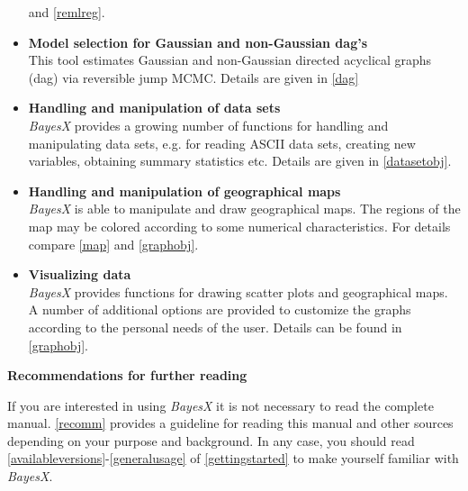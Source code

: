\begin{itemize}
and \autoref{remlreg}.
\item {\bf Model selection for Gaussian and non-Gaussian dag's} \\
This tool estimates Gaussian and non-Gaussian directed acyclical
graphs (dag) via reversible jump MCMC. Details are given in
\autoref{dag}
\item {\bf Handling and manipulation of data sets} \\
{\em BayesX} provides a growing number of functions for handling
and manipulating data sets, e.g. for reading ASCII data sets,
creating new variables, obtaining summary statistics etc. Details
are given in \autoref{datasetobj}.
\item {\bf Handling and manipulation of geographical maps} \\
{\em BayesX} is able to manipulate and draw geographical maps. The
regions of the map may be colored according to some numerical
characteristics. For details compare \autoref{map} and
\autoref{graphobj}.
\item {\bf Visualizing data} \\
{\em BayesX} provides functions for drawing scatter plots and
geographical maps. A number of additional options are provided to
customize the graphs according to the personal needs of the user.
Details can be found in \autoref{graphobj}.
\end{itemize}

\vspace{0.5cm} {\bf Recommendations for further reading}

\vspace{0.2cm} If you are interested in using {\em BayesX} it is
not necessary to read the complete manual. \autoref{recomm}
provides a guideline for reading this manual and other sources
depending on your purpose and background. In any case, you should
read \autoref{availableversions}-\autoref{generalusage} of
\autoref{gettingstarted} to make yourself familiar with {\em
BayesX}.


